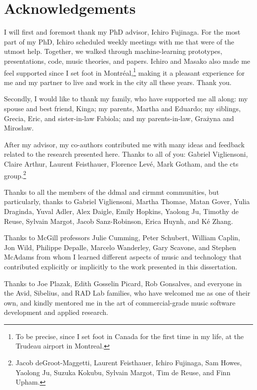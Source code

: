 \chapter*{Acknowledgements}
\label{chap:acknowledgements}

I will first and foremost thank my PhD advisor, Ichiro
Fujinaga. For the most part of my PhD, Ichiro scheduled
weekly meetings with me that were of the utmost help.
Together, we walked through machine-learning prototypes,
presentations, code, music theories, and papers. Ichiro and
Masako also made me feel supported since I set foot in
Montr\'eal,\footnote{To be precise, since I set foot in
Canada for the first time in my life, at the Trudeau airport
in Montreal.} making it a pleasant experience for me and my
partner to live and work in the city all these years. Thank
you.

Secondly, I would like to thank my family, who have
supported me all along: my spouse and best friend, Kinga; my
parents, Martha and Eduardo; my siblings, Grecia, Eric, and
sister-in-law Fabiola; and my parents-in-law, Gra\.zyna and
Miros\l{}aw.

After my advisor, my co-authors contributed me with many
ideas and feedback related to the research presented here.
Thanks to all of you: Gabriel Vigliensoni, Claire Arthur,
Laurent Feisthauer, Florence Lev\'e, Mark Gotham, and the
\gls{cts} group.\footnote{Jacob deGroot-Maggetti, Laurent
Feisthauer, Ichiro Fujinaga, Sam Howes, Yaolong Ju, Suzuka
Kokubu, Sylvain Margot, Tim de Reuse, and Finn Upham.}

Thanks to all the members of the \gls{ddmal} and
\gls{cirmmt} communities, but particularly, thanks to
Gabriel Vigliensoni, Martha Thomae, Matan Gover, Yulia
Draginda, Yuval Adler, Alex Daigle, Emily Hopkins, Yaolong
Ju, Timothy de Reuse, Sylvain Margot, Jacob Sanz-Robinson,
Erica Huynh, and K\'e Zhang.

Thanks to McGill professors Julie Cumming, Peter Schubert,
William Caplin, Jon Wild, Philippe Depalle, Marcelo
Wanderley, Gary Scavone, and Stephen McAdams from whom I
learned different aspects of music and technology that
contributed explicitly or implicitly to the work presented
in this dissertation.

Thanks to Joe Plazak, Edith Gosselin Picard, Rob Gonsalves,
and everyone in the Avid, Sibelius, and RAD Lab families,
who have welcomed me as one of their own, and kindly
mentored me in the art of commercial-grade music software
development and applied research.

